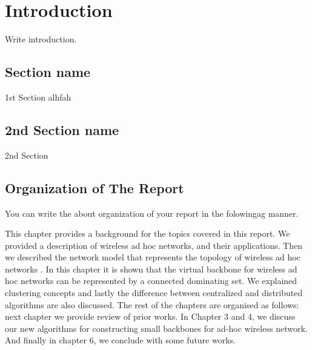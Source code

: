\chapter{Introduction}
\hspace{3mm}

Write introduction.

\section{Section name}
1st Section alhfah

\section{2nd Section name}

2nd Section

\section{Organization of The Report}

You can write the about organization of your report in the folowingag manner.

This chapter provides a background for the topics covered in this
report. We provided a description of wireless ad hoc networks, and
their applications. Then we described the network model that
represents the topology of wireless ad hoc networks \cite{Omar2016}. In this
chapter it is shown that the virtual backbone for wireless ad hoc
networks can be represented by a connected dominating set. We
explained clustering concepts and lastly the difference between
centralized and distributed algorithms are also discussed. The
rest of the chapters are organised as follows: next chapter we
provide review of prior works. In Chapter 3 and 4, we discuss our
new algorithms for constructing small backbones for ad-hoc
wireless network. And finally in chapter 6, we conclude with some
future works.

